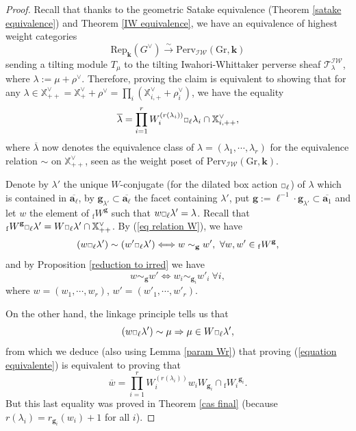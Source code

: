 \documentclass[11pt]{amsart}
\theoremstyle{plain}
\theoremstyle{remark}
\newcommand{\car}{\mbox{\relsize{-5}$\Box$}}
\numberwithin{equation}{section}
\begin{document}
	\begin{proof}
		Recall that thanks to the geometric Satake equivalence (Theorem \ref{satake equivalence}) and Theorem \ref{IW equivalence}, we have an equivalence of highest weight categories
		\begin{equation}\label{IW satake}
			\mathrm{Rep}_\mathbf{k}(G^\vee)\xrightarrow{\sim}\mathrm{Perv}_{\mathcal{IW}}(\mathrm{Gr},\mathbf{k})
		\end{equation}
		sending a tilting module $T_\mu$ to the tilting Iwahori-Whittaker perverse sheaf $\mathscr{T}^{\mathcal{IW}}_{\lambda}$, where $\lambda:=\mu+\rho^\vee$. Therefore, proving the claim is equivalent to showing that for any $\lambda\in\mathbb{X}^\vee_{++}=\mathbb{X}^\vee_{+}+\rho^{\vee}=\prod_i(\mathbb{X}^\vee_{i,+}+\rho^\vee_i)$, we have the equality
		\begin{equation}\label{equation equivalente}
			\overline{\lambda}=\prod_{i=1}^rW_i^{(r(\lambda_i))}\car_{\ell}\lambda_i\cap\mathbb{X}^\vee_{i,++},
		\end{equation}
		where $\overline{\lambda}$ now denotes the equivalence class of $\lambda=(\lambda_1,\cdots,\lambda_r)$ for the equivalence relation $\sim$ on $\mathbb{X}^\vee_{++}$, seen as the weight poset of $\mathrm{Perv}_{\mathcal{IW}}(\mathrm{Gr},\mathbf{k})$.
		
		Denote by $\lambda'$ the unique $W$-conjugate (for the dilated box action $\car_\ell$) of $\lambda$ which is contained in $\overline{\mathbf{a}_\ell}$, by $\mathbf{g}_{\lambda'}\subset \overline{\mathbf{a}_\ell}$ the facet containing $\lambda'$, put $\mathbf{g}:=\ell^{-1}\cdot \mathbf{g}_{\lambda'}\subset \overline{\mathbf{a}_1}$ and let $w$ the element of ${_\mathrm{f}W}^{\mathbf{g}}$ such that $w\car_\ell\lambda'=\lambda$. Recall that ${_\mathrm{f}W}^{\mathbf{g}}\car_\ell\lambda'=W\car_\ell\lambda'\cap\mathbb{X}^\vee_{++}$. By (\ref{eq relation W}), we have
		$$(w\car_\ell\lambda')\sim (w'\car_\ell\lambda')\Longleftrightarrow w\sim_\mathbf{g}w',~\forall w,w'\in  {_\mathrm{f}W}^{\mathbf{g}},$$
		and by Proposition \ref{reduction to irred} we have 
		$$w\sim_\mathbf{g}w'\Longleftrightarrow w_i\sim_{\mathbf{g}_i}w'_i~\forall i, $$
		where $w=(w_1,\cdots,w_r)$, $w'=(w'_1,\cdots,w'_r)$.
		
		On the other hand, the linkage principle tells us that 
		$$(w\car_\ell\lambda')\sim \mu\Rightarrow \mu\in W\car_\ell\lambda',$$
		from which we deduce (also using Lemma \ref{param Wr}) that proving (\ref{equation equivalente}) is equivalent to proving that 
		$$\overline{w}=\prod_{i=1}^rW_i^{(r(\lambda_i))}w_iW_{\mathbf{g}_i}\cap {_\mathrm{f}W_i}^{\mathbf{g}_i}.$$
		But this last equality was proved in Theorem \ref{cas final} (because $r(\lambda_i)=r_{\mathbf{g}_i}(w_i)+1$ for all $i$).
	\end{proof}
\end{document}
